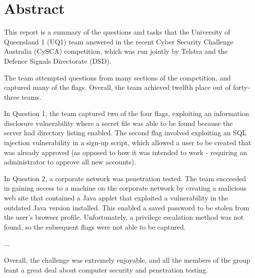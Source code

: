 \chapter{Abstract}

This report is a summary of the questions and tasks that the University of
Queensland 1 (UQ1) team answered in the recent Cyber Security Challenge
Australia (CySCA) competition, which was run jointly by Telstra and the
Defence Signals Directorate (DSD).

The team attempted questions from many sections of the competition, and
captured many of the flags. Overall, the team achieved twelfth place out of
forty-three teams.

In Question 1, the team captured two of the four flags, exploiting an
information disclosure vulnerability where a secret file was able to be found
because the server had directory listing enabled. The second flag involved
exploiting an SQL injection vulnerability in a sign-up script, which allowed
a user to be created that was already approved (as opposed to how it was
intended to work - requiring an administrator to approve all new accounts).

In Question 2, a corporate network was penetration tested. The team succeeded
in gaining access to a machine on the corporate network by creating a
malicious web site that contained a Java applet that exploited a vulnerability
in the outdated Java version installed. This enabled a saved password to be
stolen from the user's browser profile. Unfortunately, a privilege escalation
method was not found, so the subsequent flags were not able to be captured.

...

Overall, the challenge was extremely enjoyable, and all the members of the
group leant a great deal about computer security and penetration testing.
